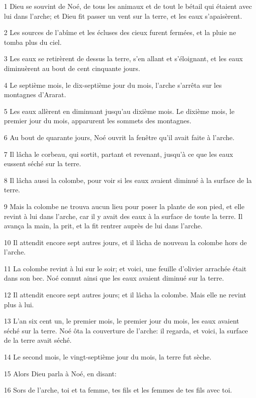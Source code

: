 \par 1 Dieu se souvint de Noé, de tous les animaux et de tout le bétail qui étaient avec lui dans l'arche; et Dieu fit passer un vent sur la terre, et les eaux s'apaisèrent.
\par 2 Les sources de l'abîme et les écluses des cieux furent fermées, et la pluie ne tomba plus du ciel.
\par 3 Les eaux se retirèrent de dessus la terre, s'en allant et s'éloignant, et les eaux diminuèrent au bout de cent cinquante jours.
\par 4 Le septième mois, le dix-septième jour du mois, l'arche s'arrêta sur les montagnes d'Ararat.
\par 5 Les eaux allèrent en diminuant jusqu'au dixième mois. Le dixième mois, le premier jour du mois, apparurent les sommets des montagnes.
\par 6 Au bout de quarante jours, Noé ouvrit la fenêtre qu'il avait faite à l'arche.
\par 7 Il lâcha le corbeau, qui sortit, partant et revenant, jusqu'à ce que les eaux eussent séché sur la terre.
\par 8 Il lâcha aussi la colombe, pour voir si les eaux avaient diminué à la surface de la terre.
\par 9 Mais la colombe ne trouva aucun lieu pour poser la plante de son pied, et elle revint à lui dans l'arche, car il y avait des eaux à la surface de toute la terre. Il avança la main, la prit, et la fit rentrer auprès de lui dans l'arche.
\par 10 Il attendit encore sept autres jours, et il lâcha de nouveau la colombe hors de l'arche.
\par 11 La colombe revint à lui sur le soir; et voici, une feuille d'olivier arrachée était dans son bec. Noé connut ainsi que les eaux avaient diminué sur la terre.
\par 12 Il attendit encore sept autres jours; et il lâcha la colombe. Mais elle ne revint plus à lui.
\par 13 L'an six cent un, le premier mois, le premier jour du mois, les eaux avaient séché sur la terre. Noé ôta la couverture de l'arche: il regarda, et voici, la surface de la terre avait séché.
\par 14 Le second mois, le vingt-septième jour du mois, la terre fut sèche.
\par 15 Alors Dieu parla à Noé, en disant:
\par 16 Sors de l'arche, toi et ta femme, tes fils et les femmes de tes fils avec toi.
